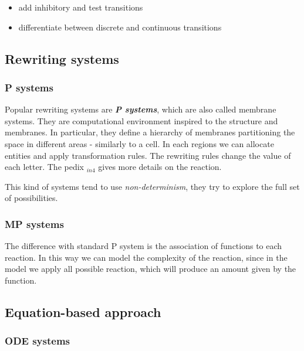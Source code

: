 \begin{itemize}
\tightlist
\item
  add inhibitory and test transitions
\item
  differentiate between discrete and continuous transitions
\end{itemize}

\hypertarget{rewriting-systems}{%
\subsection{Rewriting systems}\label{rewriting-systems}}

\hypertarget{p-systems}{%
\subsubsection{P systems}\label{p-systems}}

Popular rewriting systems are \textbf{\emph{P systems}}, which are also
called membrane systems. They are computational environment inspired to
the structure and membranes. In particular, they define a hierarchy of
membranes partitioning the space in different areas - similarly to a
cell. In each regions we can allocate entities and apply transformation
rules. The rewriting rules change the value of each letter. The pedix
\(_{in4}\) gives more details on the reaction.

This kind of systems tend to use \emph{non-determinism}, they try to
explore the full set of possibilities.

\hypertarget{mp-systems}{%
\subsubsection{MP systems}\label{mp-systems}}

The difference with standard P system is the association of functions to
each reaction. In this way we can model the complexity of the reaction,
since in the model we apply all possible reaction, which will produce an
amount given by the function.

\hypertarget{equation-based-approach}{%
\subsection{Equation-based approach}\label{equation-based-approach}}

\hypertarget{ode-systems}{%
\subsubsection{ODE systems}\label{ode-systems}}


